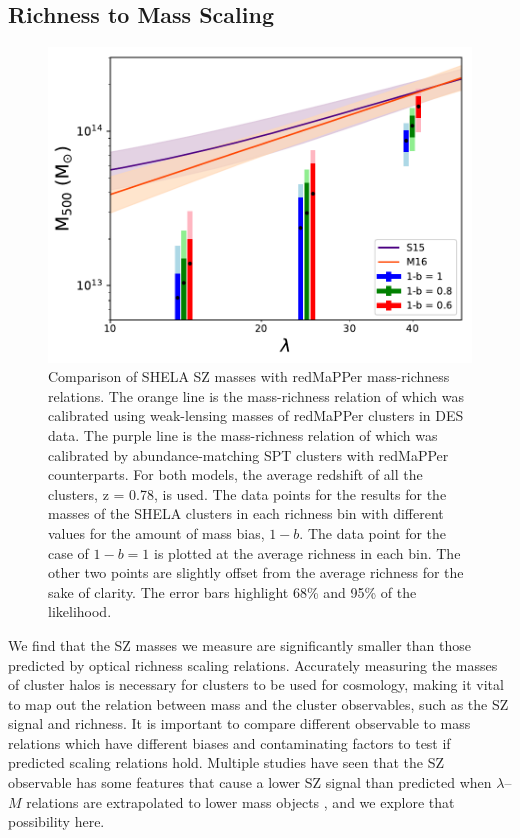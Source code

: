 \documentclass[a4paper,fleqn,usenatbib]{mnras}
\begin{document}
\subsection{Richness to Mass Scaling}
\begin{figure}
  \centering
    \includegraphics[width=\columnwidth] {M500_lambda_shela_sptvsrm_radiocorr.pdf}
  \caption{Comparison of SHELA SZ masses with redMaPPer mass-richness relations. The orange line is the mass-richness relation of \protect \cite{2016arXiv161006890M} which was calibrated using weak-lensing masses of redMaPPer clusters in DES data. The purple line is the mass-richness relation of \protect \cite{2015MNRAS.454.2305S} which was calibrated by abundance-matching SPT clusters with redMaPPer counterparts. For both models, the average redshift of all the clusters, z = 0.78, is used. The data points for the results for the masses of the SHELA clusters in each richness bin with different values for the amount of mass bias, $1-b$. The data point for the case of $1-b=1$ is plotted at the average richness in each bin. The other two points are slightly offset from the average richness for the sake of clarity. The error bars highlight 68\% and 95\% of the likelihood.}
  \label{fig:y500vslambda}
\end{figure}


We find that the SZ masses we measure are significantly smaller than those predicted by optical richness scaling relations. 
Accurately measuring the masses of cluster halos is necessary for clusters to be used for cosmology, making it vital to map out the relation between mass and the cluster observables, such as the SZ signal and richness. 
It is important to compare different observable to mass relations which have different biases and contaminating factors to test if predicted scaling relations hold. 
Multiple studies have seen that the SZ observable has some features that cause a lower SZ signal than predicted when $\lambda$--$M$ relations are extrapolated to lower mass objects \citep{2011A&A...536A..12P,2012PhRvD..85b3005D,2013ApJ...767...38S, 2017MNRAS.468.3347S}, and we explore that possibility here.  
\end{document}
